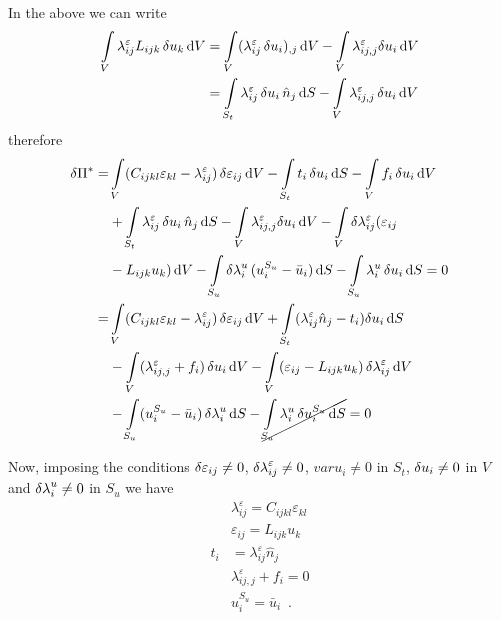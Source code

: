 In the above we can write
\begin{align*}
\int\limits_V \lambda_{ij}^\varepsilon L_{ijk}\var{u_k}\dd{V} & = \int\limits_V (\lambda_{ij}^\varepsilon \var{u_i})_{,j}\dd{V} - \int\limits_V \lambda_{ij,j}^\varepsilon \delta {u_i}\dd{V}\\
& = \int\limits_{S_t} \lambda_{ij}^\varepsilon \var{u_i}\hat {n}_j\dd{S}  - \int\limits_V \lambda_{ij,j}^\varepsilon \var{u_i}\dd{V}
\end{align*}
therefore
\begin{align*}
\delta \Pi^* =& \int\limits_V (C_{ijkl}\varepsilon_{kl} - \lambda_{ij}^\varepsilon) \var{\varepsilon}_{ij}\dd{V} - \int\limits_{S_t} t_i \var{u}_i\dd{S} - \int\limits_V f_i \var{u}_i\dd{V}\\
  &+ \int\limits_{S_t} \lambda_{ij}^\varepsilon \var{u_i}\hat{n}_j\dd{S}  - \int\limits_V \lambda_{ij,j}^\varepsilon \delta {u_i}\dd{V} - \int\limits_V \delta \lambda _{ij}^\varepsilon (\varepsilon_{ij}\\
  &- L_{ijk} u_k)\dd{V}  - \int\limits_{S_u} \var{\lambda}_i^u (u_i^{S_u} - \bar{u}_i)\dd{S} - \int\limits_{S_u} \lambda_i^u \var{u_i} \dd{S}  = 0\\
=& \int\limits_V (C_{ijkl}\varepsilon_{kl} - \lambda_{ij}^\varepsilon) \var{\varepsilon}_{ij}\dd{V}
+ \int\limits_{S_t} (\lambda_{ij}^\varepsilon \hat{n}_j - t_i)\delta {u_i}\dd{S}\\
  &- \int\limits_V (\lambda_{ij,j}^\varepsilon  + f_i) \var{u_i}\dd{V}
- \int\limits_V (\varepsilon_{ij}- L_{ijk} u_k) \var{\lambda} _{ij}^\varepsilon\dd{V}\\
  &- \int\limits_{S_u} (u_i^{S_u} - \bar{u}_i) \var{\lambda}_i^u\dd{S}  - \cancel{\int\limits_{S_u} \lambda _i^u \var{u}_i^{S_u}\dd{S}} = 0
\end{align*}

Now, imposing the conditions $\var{\varepsilon}_{ij} \neq 0$, $\var{\lambda}_{ij}^\varepsilon  \neq 0$, $var{u}_i \neq 0$ in $S_t$, $\var{u}_i \neq 0$ in $V$ and $\var{\lambda}_i^u \neq 0$ in $S_u$ we have
\begin{align}
&\lambda_{ij}^\varepsilon  = C_{ijkl} \varepsilon_{kl}\\
&\varepsilon_{ij} = L_{ijk} u_k\\
t_i &= \lambda_{ij}^\varepsilon \hat{n}_j\\
&\lambda_{ij,j}^\varepsilon  + {f_i} = 0\\
&u_i^{S_u} = \bar{u}_i \enspace .
\end{align}







